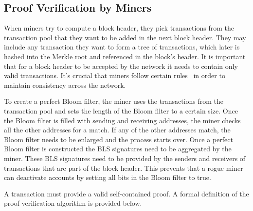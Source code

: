 \documentclass[conference]{IEEEtran}
\begin{document}
\subsection{Proof Verification by Miners}
\label{Design:ProofVerification}
When miners try to compute a block header, they pick transactions from the transaction pool that they want to be added in the next block header. They may include any transaction they want to form a tree of transactions, which later is hashed into the Merkle root and referenced in the block's header. It is important that for a block header to be accepted by the network it needs to contain only valid transactions. It's crucial that miners follow certain rules~\cite{ProtocolRules} in order to maintain consistency across the network. 

To create a perfect Bloom filter, the miner uses the transactions from the transaction pool and sets the length of the Bloom filter to a certain size. Once the Bloom filter is filled with sending and receiving addresses, the miner checks all the other addresses for a match. If any of the other addresses match, the Bloom filter needs to be enlarged and the process starts over. Once a perfect Bloom filter is constructed the BLS signatures need to be aggregated by the miner. These BLS signatures need to be provided by the senders and receivers of transactions that are part of the block header. This prevents that a rogue miner can deactivate accounts by setting all bits in the Bloom filter to true.

A transaction must provide a valid self-contained proof. A formal definition of the proof verification algorithm is provided below.
\end{document}
